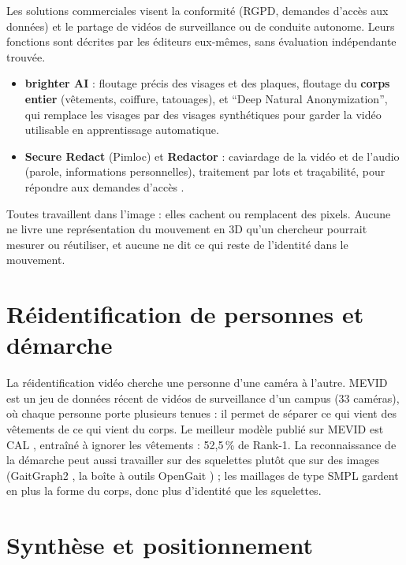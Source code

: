 \documentclass[11pt,a4paper]{report}
\begin{document}
Les solutions commerciales visent la conformité (RGPD, demandes d'accès aux données) et le partage de vidéos de surveillance ou de
conduite autonome. Leurs fonctions sont décrites par les éditeurs eux-mêmes, sans évaluation indépendante trouvée.
\begin{itemize}
    \item \textbf{brighter AI} \cite{brighterai} : floutage précis des visages et des plaques, floutage du \textbf{corps entier}
    (vêtements, coiffure, tatouages), et \enquote{Deep Natural Anonymization}, qui remplace les visages par des visages synthétiques
    pour garder la vidéo utilisable en apprentissage automatique.
    \item \textbf{Secure Redact} (Pimloc) et \textbf{Redactor} : caviardage de la vidéo et de l'audio (parole, informations
    personnelles), traitement par lots et traçabilité, pour répondre aux demandes d'accès \cite{dsar2025tools}.
\end{itemize}
Toutes travaillent dans l'image : elles cachent ou remplacent des pixels. Aucune ne livre une représentation du mouvement en 3D qu'un
chercheur pourrait mesurer ou réutiliser, et aucune ne dit ce qui reste de l'identité dans le mouvement.

\section{Réidentification de personnes et démarche}
\label{sec:sota-reid}

La réidentification vidéo cherche une personne d'une caméra à l'autre. MEVID \cite{davila2023mevid} est un jeu de données récent
de vidéos de surveillance d'un campus (33 caméras), où chaque personne porte plusieurs tenues : il permet de séparer ce qui vient des
vêtements de ce qui vient du corps. Le meilleur modèle publié sur MEVID est CAL \cite{gu2022cal}, entraîné à ignorer les vêtements :
52,5\,\% de Rank-1. La reconnaissance de la démarche peut aussi travailler sur des squelettes plutôt que sur des images (GaitGraph2
\cite{teepe2022gaitgraph2}, la boîte à outils OpenGait \cite{fan2023opengait}) ; les maillages de type SMPL gardent en plus la forme
du corps, donc plus d'identité que les squelettes.

\section{Synthèse et positionnement}
\label{sec:sota-position}
\end{document}

